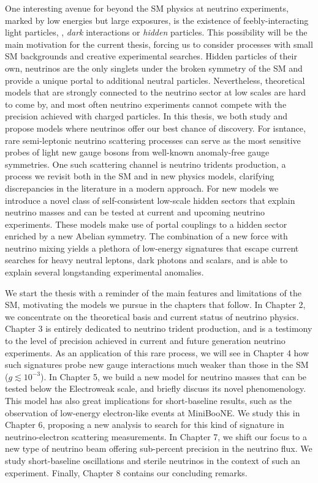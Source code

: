 \documentclass[openany,twoside,frontopenright,openright]{ip3thesis}
\begin{document}
One interesting avenue for beyond the SM physics at neutrino experiments, marked by low energies but large exposures, is the existence of feebly-interacting light particles, \eg, \emph{dark} interactions or \emph{hidden} particles. This possibility will be the main motivation for the current thesis, forcing us to consider processes with small SM backgrounds and creative experimental searches. Hidden particles of their own, neutrinos are the only singlets under the broken symmetry of the SM and provide a unique portal to additional neutral particles. Nevertheless, theoretical models that are strongly connected to the neutrino sector at low scales are hard to come by, and most often neutrino experiments cannot compete with the precision achieved with charged particles. In this thesis, we both study and propose models where neutrinos offer our best chance of discovery. For isntance, rare semi-leptonic neutrino scattering processes can serve as the most sensitive probes of light new gauge bosons from well-known anomaly-free gauge symmetries. One such scattering channel is neutrino tridents production, a process we revisit both in the SM and in new physics models, clarifying discrepancies in the literature in a modern approach. For new models we introduce a novel class of self-consistent low-scale hidden sectors that explain neutrino masses and can be tested at current and upcoming neutrino experiments. These models make use of portal couplings to a hidden sector enriched by a new Abelian symmetry. The combination of a new force with neutrino mixing yields a plethora of low-energy signatures that escape current searches for heavy neutral leptons, dark photons and scalars, and is able to explain several longstanding experimental anomalies.


We start the thesis with a reminder of the main features and limitations of the SM, motivating the models we pursue in the chapters that follow. In Chapter 2, we concentrate on the theoretical basis and current status of neutrino physics. Chapter 3 is entirely dedicated to neutrino trident production, and is a testimony to the level of precision achieved in current and future generation neutrino experiments. As an application of this rare process, we will see in Chapter 4 how such signatures probe new gauge interactions much weaker than those in the SM ($g \lesssim 10^{-3}$). In Chapter 5, we build a new model for neutrino masses that can be tested below the Electroweak scale, and briefly discuss its novel phenomenology. This model has also great implications for short-baseline results, such as the observation of low-energy electron-like events at MiniBooNE. We study this in Chapter 6, proposing a new analysis to search for this kind of signature in neutrino-electron scattering measurements. In Chapter 7, we shift our focus to a new type of neutrino beam offering sub-percent precision in the neutrino flux. We study short-baseline oscillations and sterile neutrinos in the context of such an experiment. Finally, Chapter 8 contains our concluding remarks.    
\end{document}
